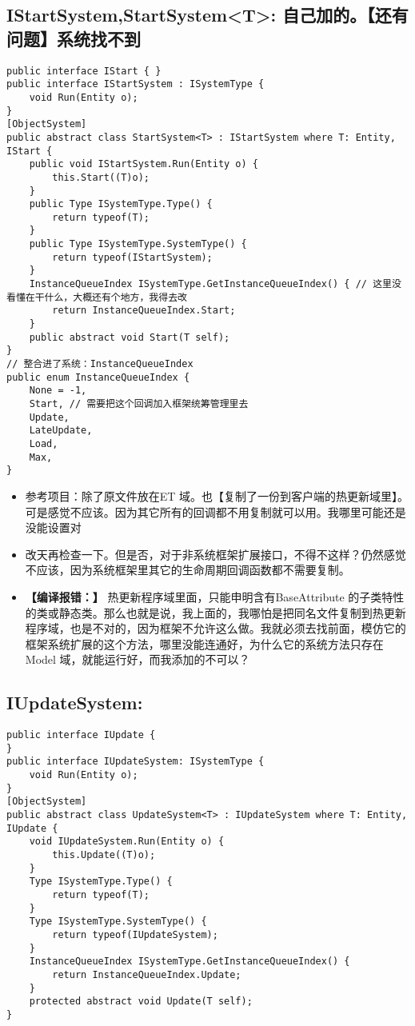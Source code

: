 \documentclass[9pt, b5paper]{article}
\begin{document}
\subsection{IStartSystem,StartSystem<T>: 自己加的。【还有问题】系统找不到}
\label{sec-2-7}
\begin{verbatim}
public interface IStart { }
public interface IStartSystem : ISystemType {
    void Run(Entity o);
}
[ObjectSystem]
public abstract class StartSystem<T> : IStartSystem where T: Entity, IStart {
    public void IStartSystem.Run(Entity o) {
        this.Start((T)o);
    }
    public Type ISystemType.Type() {
        return typeof(T);
    }
    public Type ISystemType.SystemType() {
        return typeof(IStartSystem);
    }
    InstanceQueueIndex ISystemType.GetInstanceQueueIndex() { // 这里没看懂在干什么，大概还有个地方，我得去改
        return InstanceQueueIndex.Start; 
    }
    public abstract void Start(T self);
}
// 整合进了系统：InstanceQueueIndex
public enum InstanceQueueIndex {
    None = -1,
    Start, // 需要把这个回调加入框架统筹管理里去 
    Update,
    LateUpdate,
    Load,
    Max,
}
\end{verbatim}
\begin{itemize}
\item 参考项目：除了原文件放在ET 域。也【复制了一份到客户端的热更新域里】。可是感觉不应该。因为其它所有的回调都不用复制就可以用。我哪里可能还是没能设置对
\item 改天再检查一下。但是否，对于非系统框架扩展接口，不得不这样？仍然感觉不应该，因为系统框架里其它的生命周期回调函数都不需要复制。
\item \textbf{【编译报错：】} 热更新程序域里面，只能申明含有BaseAttribute 的子类特性的类或静态类。那么也就是说，我上面的，我哪怕是把同名文件复制到热更新程序域，也是不对的，因为框架不允许这么做。我就必须去找前面，模仿它的框架系统扩展的这个方法，哪里没能连通好，为什么它的系统方法只存在Model 域，就能运行好，而我添加的不可以？
\end{itemize}
\subsection{IUpdateSystem:}
\label{sec-2-8}
\begin{verbatim}
public interface IUpdate {
}
public interface IUpdateSystem: ISystemType {
    void Run(Entity o);
}
[ObjectSystem]
public abstract class UpdateSystem<T> : IUpdateSystem where T: Entity, IUpdate {
    void IUpdateSystem.Run(Entity o) {
        this.Update((T)o);
    }
    Type ISystemType.Type() {
        return typeof(T);
    }
    Type ISystemType.SystemType() {
        return typeof(IUpdateSystem);
    }
    InstanceQueueIndex ISystemType.GetInstanceQueueIndex() {
        return InstanceQueueIndex.Update;
    }
    protected abstract void Update(T self);
}
\end{verbatim}
\end{document}
